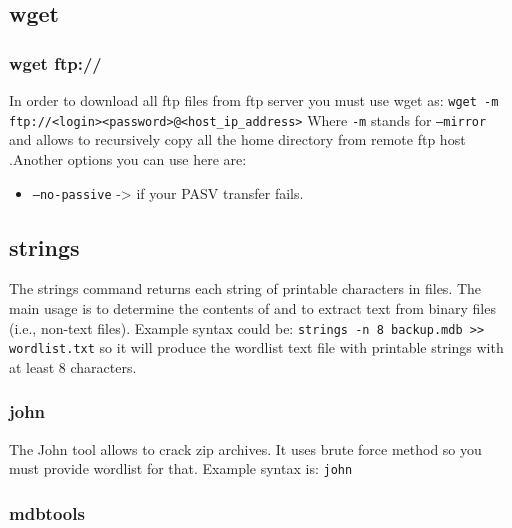 \documentclass{article}[12pt]
\newcommand{\q}[1]{\texttt{#1}}
\begin{document}
{\subsection{wget}
\subsubsection{wget ftp://}
In order to download all ftp files from ftp server you must use wget as: \newline \newline
\q{wget -m ftp://<login><password>@<host\_ip\_address>} \newline \newline
Where \q{-m} stands for \q{--mirror} and allows to recursively copy all the home directory from remote ftp host .Another options you can use here are:
\begin{itemize}
    \item \q{--no-passive} -> if your PASV transfer fails.
\end{itemize}
\subsection{strings}

The strings command returns each string of printable characters in files.
The main usage is to determine the contents of and to extract text from binary files (i.e., non-text files).
Example syntax could be: \newline
\q{strings -n 8 backup.mdb >> wordlist.txt}\newline
so it will produce the wordlist text file with printable strings with at least 8 characters.
\subsubsection{john}
\label{subsubsec:john}
The John tool allows to crack zip archives.
It uses brute force method so you must provide wordlist for that.
Example syntax is: \newline
\q{john }
\subsubsection{mdbtools}
}
\end{document}
